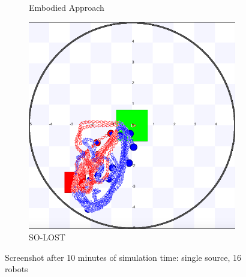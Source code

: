 \documentclass[letterpaper, 10 pt, conference]{ieeeconf}  %
\begin{document}
\begin{figure}[h]
\begin{subfigure}{.25\textwidth}
          \centering
          \caption{Embodied Approach}
     \end{subfigure}
    \centering
     \begin{subfigure}{.25\textwidth}
       \includegraphics[width=0.7\linewidth]{images/so-lost/1/raw/16.png}
          \centering
          \caption{SO-LOST}
     \end{subfigure}
   
   \centering
   \caption{Screenshot after 10 minutes of simulation time: single source, 16 robots}
   \label{fig:screenshot_1_source}
\end{figure}




\end{document}
